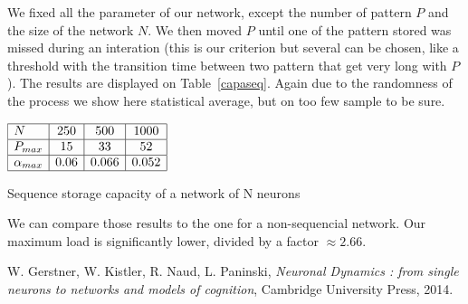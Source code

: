 We fixed all the parameter of our network, except the number of pattern $P$ and the size of the
network $N$. We then moved $P$ until one of the pattern stored was missed during an interation (this is our criterion
but several can be chosen, like a threshold with the transition time between two pattern that get very long
with $P$). The results are displayed on Table~\ref{capaseq}. Again due to the randomness of the process
we show here statistical average, but on too few sample to be sure. 

\begin{table}[h]\label{capaseq}
\begin{center}
\begin{math}
    \begin{array}{|l|c|c|c|}
    \hline
    N & 250 & 500 & 1000 \\ \hline
    P_{max} & 15 & 33 & 52 \\ \hline
    \alpha_{max}& 0.06 & 0.066 & 0.052\\ \hline
    \end{array}
\end{math}
\end{center}
\caption{Sequence storage capacity  of a network of N neurons}
\end{table}
 We can compare those results to the one for a non-sequencial network. Our maximum load
 is significantly lower, divided by a factor $\approx 2.66$. 


\begin{thebibliography}{}
 W. Gerstner, W. Kistler, R. Naud, L. Paninski, \textit{Neuronal Dynamics : from single neurons to networks and models of cognition}, Cambridge University Press, 2014.
\end{thebibliography}
